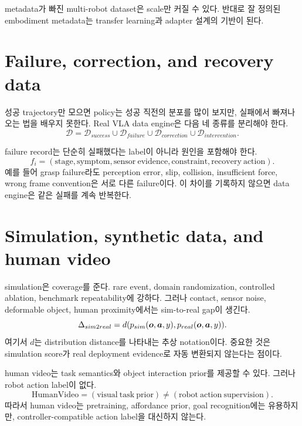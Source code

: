metadata가 빠진 multi-robot dataset은 scale만 커질 수 있다. 반대로 잘 정의된 embodiment metadata는 transfer learning과 adapter 설계의 기반이 된다.

\section{Failure, correction, and recovery data}

성공 trajectory만 모으면 policy는 성공 직전의 분포를 많이 보지만, 실패에서 빠져나오는 법을 배우지 못한다. Real VLA data engine은 다음 네 종류를 분리해야 한다.
\begin{equation}
  \mathcal{D}
  =
  \mathcal{D}_{success}
  \cup
  \mathcal{D}_{failure}
  \cup
  \mathcal{D}_{correction}
  \cup
  \mathcal{D}_{intervention}.
  \label{eq:ch14-success-failure-data}
\end{equation}

failure record는 단순히 실패했다는 label이 아니라 원인을 포함해야 한다.
\begin{equation}
  f_i
  =
  (
  \mathrm{stage},
  \mathrm{symptom},
  \mathrm{sensor\ evidence},
  \mathrm{constraint},
  \mathrm{recovery\ action}
  ).
  \label{eq:ch14-failure-record}
\end{equation}
예를 들어 grasp failure라도 perception error, slip, collision, insufficient force, wrong frame convention은 서로 다른 failure이다. 이 차이를 기록하지 않으면 data engine은 같은 실패를 계속 반복한다.

\section{Simulation, synthetic data, and human video}

simulation은 coverage를 준다. rare event, domain randomization, controlled ablation, benchmark repeatability에 강하다. 그러나 contact, sensor noise, deformable object, human proximity에서는 sim-to-real gap이 생긴다.
\begin{equation}
  \Delta_{sim2real}
  =
  d
  (
  p_{sim}(\bm{o},\bm{a},y),
  p_{real}(\bm{o},\bm{a},y)
  ).
  \label{eq:ch14-sim2real-gap}
\end{equation}
여기서 $d$는 distribution distance를 나타내는 추상 notation이다. 중요한 것은 simulation score가 real deployment evidence로 자동 변환되지 않는다는 점이다.

human video는 task semantics와 object interaction prior를 제공할 수 있다. 그러나 robot action label이 없다.
\begin{equation}
  \mathrm{HumanVideo}
  =
  (\mathrm{visual\ task\ prior})
  \neq
  (\mathrm{robot\ action\ supervision}).
  \label{eq:ch14-human-video-gap}
\end{equation}
따라서 human video는 pretraining, affordance prior, goal recognition에는 유용하지만, controller-compatible action label을 대신하지 않는다.

